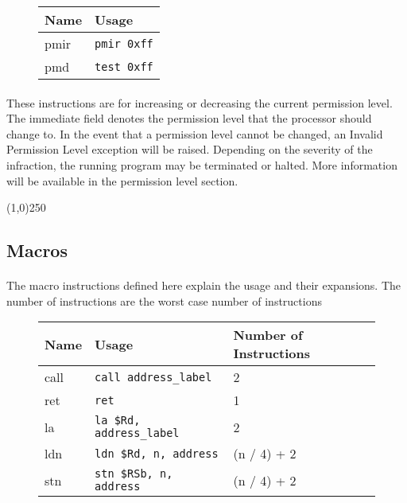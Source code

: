 \documentclass[letterpaper, 11pt]{article}
\begin{document}
\begin{figure}[!h]
	\begin{center}
		\begin{tabular}{|l|l|}
			\hline
			Name		& Usage \\ \hline
			pmir	& \texttt{pmir	0xff}	\\ \hline
			pmd		& \texttt{test	0xff}	\\ \hline
		 		\end{tabular} 
	\end{center}
	
\end{figure}
\paragraph{} These instructions are for increasing or decreasing the current permission level. The immediate field
denotes the permission level that the processor should change to. In the event that a permission level cannot be changed,
an Invalid Permission Level exception will be raised. Depending on the severity of the infraction, the running program
may be terminated or halted. More information will be available in the permission level section.

\begin{center}
	\line(1,0){250}
\end{center}


\subsection{Macros}
\paragraph{} The macro instructions defined here explain the usage and their expansions.
The number of instructions are the worst case number of instructions

\begin{figure}[!h]
	\begin{center}
		\begin{tabular}{|l|l|l|}
			\hline
			Name	& Usage & Number of Instructions\\ \hline
			call	& \texttt{call	address\_label}		&	2	\\ \hline
			ret		& \texttt{ret	}					&	1	\\ \hline
			la		& \texttt{la \$Rd, address\_label}	& 	2	\\ \hline
			ldn		& \texttt{ldn \$Rd, n, address}		&   (n / 4) + 2\\ \hline
			stn		& \texttt{stn \$RSb, n, address}	&   (n / 4) + 2 \\ \hline
		 		\end{tabular} 
	\end{center}
	
\end{figure}
\end{document}
